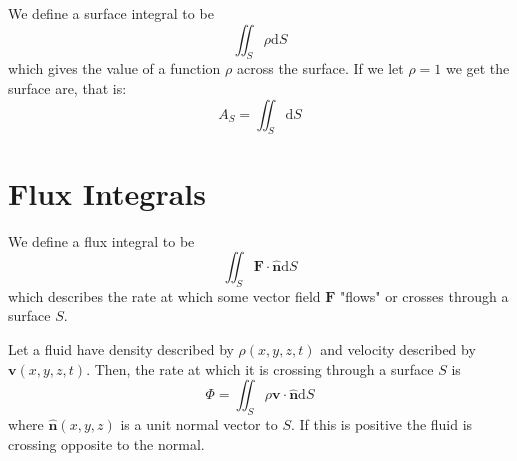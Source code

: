 \begin{definition}
	We define a surface integral to be
	\[
		\iint_S \rho \mathrm{d}S
	\] 
	which gives the value of a function $\rho$ across the surface. If we let $\rho = 1$ we get the surface are, that is:
	\[
		A_S = \iint_S \mathrm{d}S
	\] 
\end{definition}
\section{Flux Integrals}
\begin{definition}
	We define a flux integral to be 
	\[
		\iint_S \mathbf{F} \cdot \hat{\mathbf{n}}\mathrm{d}S
	\]
	which describes the rate at which some vector field $\mathbf{F}$ "flows" or crosses through a surface $S$.
\end{definition}
\begin{lemma}
	Let a fluid have density described by $\rho(x,y,z,t)$ and velocity described by $ \mathbf{v}(x,y,z,t)$. Then, the rate at which it is crossing through a surface $S$ is
	\[
		\Phi = \iint_S \rho \mathbf{v}\cdot\hat{\mathbf{n}}\mathrm{d}S
	\] 
	where $\hat{\mathbf{n}}(x,y,z)$ is a unit normal vector to $S$.
	If this is positive the fluid is crossing opposite to the normal.
\end{lemma}

